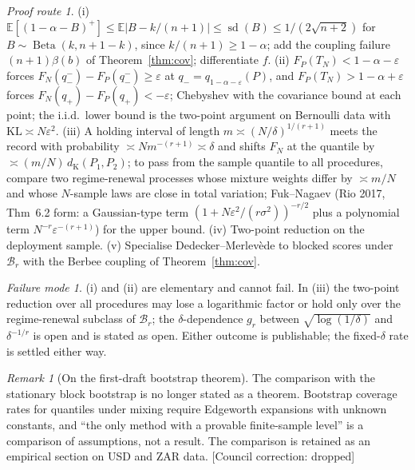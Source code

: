 \documentclass[11pt,a4paper]{article}
\newcommand{\corr}[1]{{\color{ox}\textsf{\small [Council correction: #1]}}}
\theoremstyle{plain}
\theoremstyle{definition}
\theoremstyle{remark}
\newtheorem*{remark}{Remark}
\newtheorem*{route}{Proof route}
\newtheorem*{failure}{Failure mode}
\newcommand{\E}{\mathbb{E}}
\newcommand{\dK}{d_{\mathrm{K}}}
\DeclareMathOperator{\Beta}{Beta}
\begin{document}
\begin{route}
(i) $\E[(1-\alpha-B)^+]\le\E|B-k/(n+1)|\le\operatorname{sd}(B)\le1/(2\sqrt{n+2})$ for $B\sim\Beta(k,n+1-k)$, since $k/(n+1)\ge1-\alpha$; add the coupling failure $(n+1)\beta(b)$ of Theorem~\ref{thm:cov}; differentiate $f$. (ii) $F_P(T_N)<1-\alpha-\varepsilon$ forces $F_N(q_-^-)-F_P(q_-^-)\ge\varepsilon$ at $q_-=q_{1-\alpha-\varepsilon}(P)$, and $F_P(T_N)>1-\alpha+\varepsilon$ forces $F_N(q_+)-F_P(q_+)<-\varepsilon$; Chebyshev with the covariance bound at each point; the i.i.d.\ lower bound is the two-point argument on Bernoulli data with $\mathrm{KL}\asymp N\varepsilon^2$. (iii) A holding interval of length $m\asymp(N/\delta)^{1/(r+1)}$ meets the record with probability $\asymp Nm^{-(r+1)}\asymp\delta$ and shifts $F_N$ at the quantile by $\asymp(m/N)\,\dK(P_1,P_2)$; to pass from the sample quantile to all procedures, compare two regime-renewal processes whose mixture weights differ by $\asymp m/N$ and whose $N$-sample laws are close in total variation; Fuk--Nagaev (Rio 2017, Thm~6.2 form: a Gaussian-type term $(1+N\varepsilon^2/(r\sigma^2))^{-r/2}$ plus a polynomial term $N^{-r}\varepsilon^{-(r+1)}$) for the upper bound. (iv) Two-point reduction on the deployment sample. (v) Specialise Dedecker--Merlev\`ede to blocked scores under $\mathcal B_r$ with the Berbee coupling of Theorem~\ref{thm:cov}.
\end{route}
\begin{failure}
(i) and (ii) are elementary and cannot fail. In (iii) the two-point reduction over all procedures may lose a logarithmic factor or hold only over the regime-renewal subclass of $\mathcal B_r$; the $\delta$-dependence $g_r$ between $\sqrt{\log(1/\delta)}$ and $\delta^{-1/r}$ is open and is stated as open. Either outcome is publishable; the fixed-$\delta$ rate is settled either way.
\end{failure}

\begin{remark}[On the first-draft bootstrap theorem]
The comparison with the stationary block bootstrap is no longer stated as a theorem. Bootstrap coverage rates for quantiles under mixing require Edgeworth expansions with unknown constants, and ``the only method with a provable finite-sample level'' is a comparison of assumptions, not a result. The comparison is retained as an empirical section on USD and ZAR data. \corr{dropped}
\end{remark}
\end{document}
